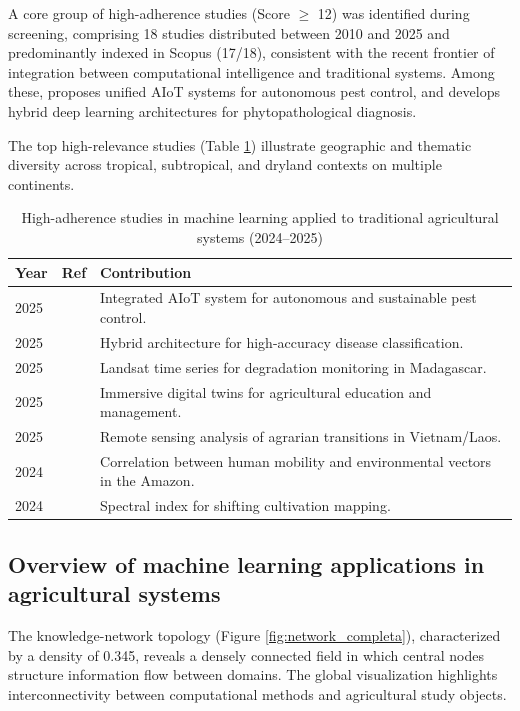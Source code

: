 \documentclass[lineno,pdflatex,sn-apa]{sn-jnl}
\begin{document}
A core group of high-adherence studies (Score $\geq$ 12) was identified during screening, comprising 18 studies distributed between 2010 and 2025 and predominantly indexed in Scopus (17/18), consistent with the recent frontier of integration between computational intelligence and traditional systems. Among these, \citet{Li2025} proposes unified AIoT systems for autonomous pest control, and \citet{Tripathi2025} develops hybrid deep learning architectures for phytopathological diagnosis.

The top high-relevance studies (Table \ref{tab:top7}) illustrate geographic and thematic diversity across tropical, subtropical, and dryland contexts on multiple continents.

\begin{table}[h]
\caption{High-adherence studies in machine learning applied to traditional agricultural systems (2024--2025)}
\label{tab:top7}
\centering
\small
\setlength{\tabcolsep}{4pt}
\renewcommand{\arraystretch}{1.1}
\begin{tabular}{@{}p{1.2cm}p{2.3cm}p{\dimexpr\linewidth-3.5cm\relax}@{}}
\toprule
Year & Ref & Contribution \\
\midrule
2025 & \cite{Li2025} & Integrated AIoT system for autonomous and sustainable pest control. \\
2025 & \cite{Tripathi2025} & Hybrid architecture for high-accuracy disease classification. \\
2025 & \cite{Ghilardi2025} & Landsat time series for degradation monitoring in Madagascar. \\
2025 & \cite{Spyrou2025} & Immersive digital twins for agricultural education and management. \\
2025 & \cite{Persson2025} & Remote sensing analysis of agrarian transitions in Vietnam/Laos. \\
2024 & \cite{Trehard2024} & Correlation between human mobility and environmental vectors in the Amazon. \\
2024 & \cite{Li2024} & Spectral index for shifting cultivation mapping. \\
\bottomrule
\end{tabular}
\end{table}

\subsection{Overview of machine learning applications in agricultural systems}

The knowledge-network topology (Figure \ref{fig:network_completa}), characterized by a density of 0.345, reveals a densely connected field in which central nodes structure information flow between domains. The global visualization highlights interconnectivity between computational methods and agricultural study objects.
\end{document}
